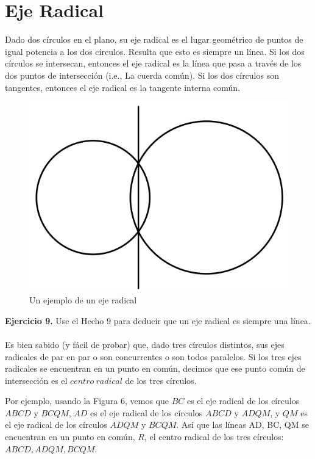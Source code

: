 \documentclass[11pt, a4paper]{article}
\begin{document}
	\setcounter{section}{5}
	\section{Eje Radical}
	Dado dos c\'irculos en el plano, su eje radical es el lugar geom\'etrico de puntos de igual potencia a los dos c\'irculos. Resulta que esto es siempre un l\'inea. Si los dos c\'irculos se intersecan, entonces el eje radical es la l\'inea que pasa a trav\'es de los dos puntos de intersecci\'on (i.e., La cuerda com\'un). Si los dos c\'irculos son tangentes, entonces el eje radical es la tangente interna com\'un.
	\setcounter {figure}{6}
	\begin{figure}[h]
		\centering
		\includegraphics[scale=0.4]{p6.1}
		\caption{Un ejemplo de un eje radical}
	\end{figure}

\textbf{Ejercicio 9.} Use el Hecho 9 para deducir que un eje radical es siempre una l\'inea.
\\\\
Es bien sabido (y f\'acil de probar) que, dado tres c\'irculos distintos, sus ejes radicales de par en par o son concurrentes o son todos paralelos. Si los tres ejes radicales se encuentran en un punto en com\'un, decimos que ese punto com\'un de intersecci\'on es el $centro \ radical$ de los tres c\'irculos.

Por ejemplo, usando la Figura 6, vemos que $BC$ es el eje radical de los c\'irculos $ABCD$ y $BCQM$, $AD$ es el eje radical de los c\'irculos $ABCD$ y $ADQM$, y $QM$ es el eje radical de los c\'irculos $ADQM$ y $BCQM$. As\'i que las l\'ineas AD, BC, QM se encuentran en un punto en com\'un, $R$, el centro radical de los tres c\'irculos: $ABCD, ADQM, BCQM$.
\end{document}
